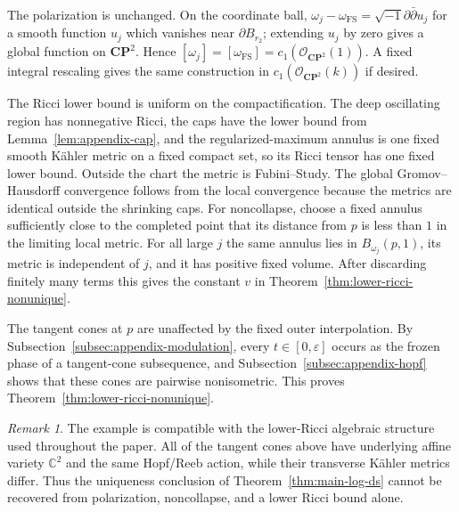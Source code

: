 \documentclass[11pt]{amsart}
\theoremstyle{definition}
\theoremstyle{remark}
\newtheorem*{remark}{Remark}
\begin{document}
The polarization is unchanged.  On the coordinate ball, $\omega_j-\omega_{\mathrm{FS}}=\sqrt{-1}\partial\bar\partial u_j$ for a smooth function $u_j$ which vanishes near $\partial B_{r_2}$; extending $u_j$ by zero gives a global function on $\mathbf{CP}^2$.  Hence $[\omega_j]=[\omega_{\mathrm{FS}}]=c_1(\mathcal O_{\mathbf{CP}^2}(1))$.  A fixed integral rescaling gives the same construction in $c_1(\mathcal O_{\mathbf{CP}^2}(k))$ if desired.

The Ricci lower bound is uniform on the compactification.  The deep oscillating region has nonnegative Ricci, the caps have the lower bound from Lemma~\ref{lem:appendix-cap}, and the regularized-maximum annulus is one fixed smooth K\"ahler metric on a fixed compact set, so its Ricci tensor has one fixed lower bound.  Outside the chart the metric is Fubini--Study.  The global Gromov--Hausdorff convergence follows from the local convergence because the metrics are identical outside the shrinking caps.  For noncollapse, choose a fixed annulus sufficiently close to the completed point that its distance from $p$ is less than $1$ in the limiting local metric.  For all large $j$ the same annulus lies in $B_{\omega_j}(p,1)$, its metric is independent of $j$, and it has positive fixed volume.  After discarding finitely many terms this gives the constant $v$ in Theorem~\ref{thm:lower-ricci-nonunique}.

The tangent cones at $p$ are unaffected by the fixed outer interpolation.  By Subsection~\ref{subsec:appendix-modulation}, every $t\in[0,\varepsilon]$ occurs as the frozen phase of a tangent-cone subsequence, and Subsection~\ref{subsec:appendix-hopf} shows that these cones are pairwise nonisometric.  This proves Theorem~\ref{thm:lower-ricci-nonunique}.

\begin{remark}
The example is compatible with the lower-Ricci algebraic structure used throughout the paper.  All of the tangent cones above have underlying affine variety $\mathbb C^2$ and the same Hopf/Reeb action, while their transverse K\"ahler metrics differ.  Thus the uniqueness conclusion of Theorem~\ref{thm:main-log-ds} cannot be recovered from polarization, noncollapse, and a lower Ricci bound alone.
\end{remark}
\end{document}
